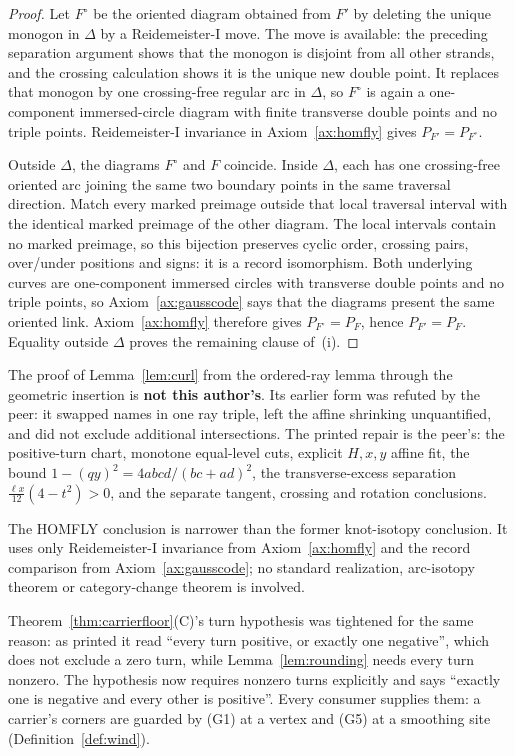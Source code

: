 \begin{proof}
Let $F^{\circ}$ be the oriented diagram obtained from $F'$ by deleting the
unique monogon in $\Delta$ by a Reidemeister-I move.  The move is available:
the preceding separation argument shows that the monogon is disjoint from
all other strands, and the crossing calculation shows it is the unique new
double point.  It replaces that monogon by one crossing-free regular arc in
$\Delta$, so $F^{\circ}$ is again a one-component immersed-circle diagram with
finite transverse double points and no triple points.  Reidemeister-I
invariance in Axiom~\ref{ax:homfly} gives $P_{F'}=P_{F^{\circ}}$.

Outside $\Delta$, the diagrams $F^{\circ}$ and $F$ coincide.  Inside
$\Delta$, each has one crossing-free oriented arc joining the same two
boundary points in the same traversal direction.  Match every marked
preimage outside that local traversal interval with the identical marked
preimage of the other diagram.  The local intervals contain no marked
preimage, so this bijection preserves cyclic order, crossing pairs,
over/under positions and signs: it is a record isomorphism.  Both underlying
curves are one-component immersed circles with transverse double points and
no triple points, so Axiom~\ref{ax:gausscode} says that the diagrams present
the same oriented link.  Axiom~\ref{ax:homfly} therefore gives
$P_{F^{\circ}}=P_F$, hence $P_{F'}=P_F$.  Equality outside $\Delta$ proves the
remaining clause of~(i).
\end{proof}

\begin{remark}\label{rem:curlauthor}
The proof of Lemma~\ref{lem:curl} from the ordered-ray lemma through the
geometric insertion is \textbf{not this author's}.  Its earlier form was
refuted by the peer: it swapped names in one ray triple, left the affine
shrinking unquantified, and did not exclude additional intersections.  The
printed repair is the peer's: the positive-turn chart, monotone equal-level
cuts, explicit $H,x,y$ affine fit, the bound
$1-(qy)^2=4abcd/(bc+ad)^2$, the transverse-excess separation
$\frac{\ell x}{12}(4-t^2)>0$, and the separate tangent, crossing and
rotation conclusions.

The HOMFLY conclusion is narrower than the former knot-isotopy conclusion.
It uses only Reidemeister-I invariance from Axiom~\ref{ax:homfly} and the
record comparison from Axiom~\ref{ax:gausscode}; no standard realization,
arc-isotopy theorem or category-change theorem is involved.

Theorem~\ref{thm:carrierfloor}(C)'s turn hypothesis was tightened for the same
reason: as printed it read ``every turn positive, or exactly one negative'',
which does not exclude a zero turn, while Lemma~\ref{lem:rounding} needs every
turn nonzero. The hypothesis now requires nonzero turns explicitly and says
``exactly one is negative and every other is positive''. Every consumer
supplies them: a carrier's corners are
guarded by (G1) at a vertex and (G5) at a smoothing site
(Definition~\ref{def:wind}).
\end{remark}

